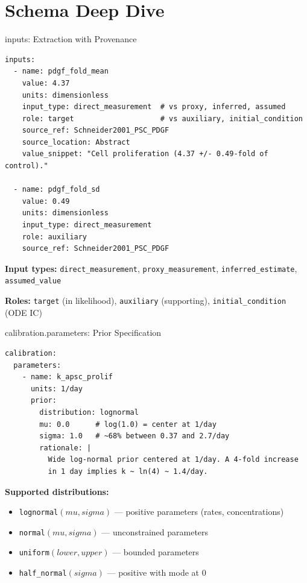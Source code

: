 \documentclass[aspectratio=169,10pt]{beamer}
\begin{document}
\section{Schema Deep Dive}

\begin{frame}[fragile]{inputs: Extraction with Provenance}
\begin{lstlisting}[style=yaml]
inputs:
  - name: pdgf_fold_mean
    value: 4.37
    units: dimensionless
    input_type: direct_measurement  # vs proxy, inferred, assumed
    role: target                    # vs auxiliary, initial_condition
    source_ref: Schneider2001_PSC_PDGF
    source_location: Abstract
    value_snippet: "Cell proliferation (4.37 +/- 0.49-fold of control)."

  - name: pdgf_fold_sd
    value: 0.49
    units: dimensionless
    input_type: direct_measurement
    role: auxiliary
    source_ref: Schneider2001_PSC_PDGF
\end{lstlisting}

\textbf{Input types:} \texttt{direct\_measurement}, \texttt{proxy\_measurement}, \texttt{inferred\_estimate}, \texttt{assumed\_value}

\textbf{Roles:} \texttt{target} (in likelihood), \texttt{auxiliary} (supporting), \texttt{initial\_condition} (ODE IC)
\end{frame}

\begin{frame}[fragile]{calibration.parameters: Prior Specification}
\begin{lstlisting}[style=yaml]
calibration:
  parameters:
    - name: k_apsc_prolif
      units: 1/day
      prior:
        distribution: lognormal
        mu: 0.0      # log(1.0) = center at 1/day
        sigma: 1.0   # ~68% between 0.37 and 2.7/day
        rationale: |
          Wide log-normal prior centered at 1/day. A 4-fold increase
          in 1 day implies k ~ ln(4) ~ 1.4/day.
\end{lstlisting}

\textbf{Supported distributions:}
\begin{itemize}
    \item \texttt{lognormal}$(mu, sigma)$ --- positive parameters (rates, concentrations)
    \item \texttt{normal}$(mu, sigma)$ --- unconstrained parameters
    \item \texttt{uniform}$(lower, upper)$ --- bounded parameters
    \item \texttt{half\_normal}$(sigma)$ --- positive with mode at 0
\end{itemize}
\end{frame}
\end{document}
